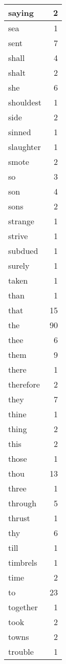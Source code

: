 \begin{center}
\begin{longtable}{l|r}
saying & 2\\ \hline 
sea & 1\\ \hline 
sent & 7\\ \hline 
shall & 4\\ \hline 
shalt & 2\\ \hline 
she & 6\\ \hline 
shouldest & 1\\ \hline 
side & 2\\ \hline 
sinned & 1\\ \hline 
slaughter & 1\\ \hline 
smote & 2\\ \hline 
so & 3\\ \hline 
son & 4\\ \hline 
sons & 2\\ \hline 
strange & 1\\ \hline 
strive & 1\\ \hline 
subdued & 1\\ \hline 
surely & 1\\ \hline 
taken & 1\\ \hline 
than & 1\\ \hline 
that & 15\\ \hline 
the & 90\\ \hline 
thee & 6\\ \hline 
them & 9\\ \hline 
there & 1\\ \hline 
therefore & 2\\ \hline 
they & 7\\ \hline 
thine & 1\\ \hline 
thing & 2\\ \hline 
this & 2\\ \hline 
those & 1\\ \hline 
thou & 13\\ \hline 
three & 1\\ \hline 
through & 5\\ \hline 
thrust & 1\\ \hline 
thy & 6\\ \hline 
till & 1\\ \hline 
timbrels & 1\\ \hline 
time & 2\\ \hline 
to & 23\\ \hline 
together & 1\\ \hline 
took & 2\\ \hline 
towns & 2\\ \hline 
trouble & 1\\ \hline 

\end{longtable}
\end{center}
